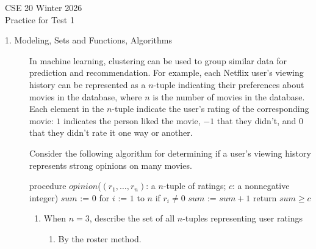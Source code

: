 \documentclass[12pt, oneside]{article}
\author{CSE20W26}
\newif \ifsolution
\newcommand{\sol}[1]{\medskip\fbox{\begin{minipage}{5.5in}{#1}\end{minipage}}\medskip}
\begin{document}
\begin{center}
{\Large
CSE 20 Winter 2026\\ 
Practice for Test 1 \ifsolution{\qquad Solutions}\fi}
\end{center}

\thispagestyle{empty}

\ifsolution{}
\else{}
\fi

\begin{description}

\item[1. Modeling, Sets and Functions, Algorithms] 
In machine learning, clustering can be used to group similar data for prediction and recommendation.  For example,
each Netflix user's viewing history can be represented as a $n$-tuple indicating their preferences about
movies in the database, where $n$ is the number of movies in the database.  Each element in the $n$-tuple indicate
the user's rating of the corresponding movie: 
$1$ indicates the person liked the movie, $-1$
that they didn't, and $0$ that they didn't rate it one way or another.

Consider the following algorithm for determining if a user's viewing history represents
strong opinions on many movies.
\begin{algorithm}[caption={Determine if user's ratings tuple encode strong opinions}]
procedure $\textit{opinion}$($(r_1, \ldots, r_n)$: a $n$-tuple of ratings; $c$: a nonnegative integer)
$sum$ := $0$
for $i$ := $1$ to $n$
  if $r_i \neq 0$
    $sum$ := $sum + 1$
return $sum \geq c$
\end{algorithm}

  \begin{enumerate}\item When $n = 3$, describe the set of all $n$-tuples representing user ratings
  \begin{enumerate}\item By the roster method.
  
  \ifsolution{
  \sol{There are 27 $3$-tuples whose elements are each $-1$, $0$, or $1$.  We can list them as follows.
  \begin{align*}
  \{ & (-1, -1, -1) , (-1, -1, 0) , (-1, -1, 1) , (-1, 0, -1), (-1, 0, 0), (-1, 0, 1),\\
     & (-1, 1, -1), (-1, 1, 0), (-1, 1, 1), (0, -1, -1) , (0, -1, 0) , (0, -1, 1) , \\
     & (0, 0, -1), (0, 0, 0), (0, 0, 1), (0, 1, -1), (0, 1, 0), (0, 1, 1), (1, -1, -1) , \\
     & (1, -1, 0) , (1, -1, 1) , (1, 0, -1), (1, 0, 0), (1, 0, 1), (1, 1, -1), (1, 1, 0), (1, 1, 1) \}  
  \end{align*}
  }}\fi
  

\end{enumerate}
\end{enumerate}
\end{description}
\end{document}
